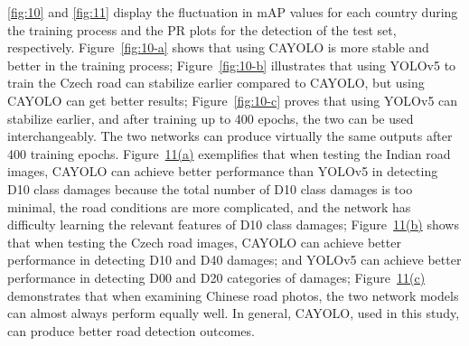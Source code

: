 \documentclass[sensors,article,submit,moreauthors]{Definitions/mdpi}
\begin{document}
    \autoref{fig:10} and \autoref{fig:11} display the fluctuation in mAP values for each country during the training process and the PR plots for the detection of the test set, respectively. Figure~\autoref{fig:10-a} shows that using CAYOLO is more stable and better in the training process; Figure~\autoref{fig:10-b} illustrates that using YOLOv5 to train the Czech road can stabilize earlier compared to CAYOLO, but using CAYOLO can get better results; Figure~\autoref{fig:10-c} proves that using YOLOv5 can stabilize earlier, and after training up to 400 epochs, the two can be used interchangeably. The two networks can produce virtually the same outputs after 400 training epochs. Figure~\hyperref[fig:11-a]{11(a)} exemplifies that when testing the Indian road images, CAYOLO can achieve better performance than YOLOv5 in detecting D10 class damages because the total number of D10 class damages is too minimal, the road conditions are more complicated, and the network has difficulty learning the relevant features of D10 class damages; Figure~\hyperref[fig:11-b]{11(b)} shows that when testing the Czech road images, CAYOLO can achieve better performance in detecting D10 and D40 damages; and YOLOv5 can achieve better performance in detecting D00 and D20 categories of damages; Figure~\hyperref[fig:11-c]{11(c)} demonstrates that when examining Chinese road photos, the two network models can almost always perform equally well. In general, CAYOLO, used in this study, can produce better road detection outcomes.
\end{document}
